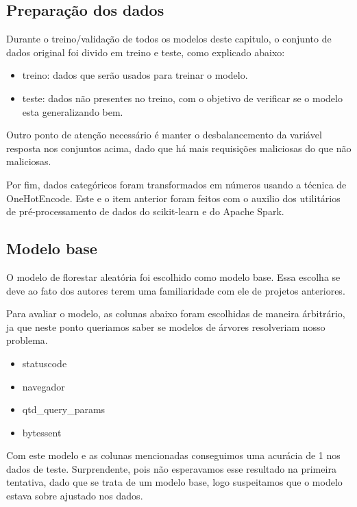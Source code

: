 \subsection{Preparação dos dados}

Durante o treino/validação de todos os modelos deste capitulo, o conjunto de dados original foi divido 
em treino e teste, como explicado abaixo:

\begin{itemize}
    \item treino: dados que serão usados para treinar o modelo.
    \item teste: dados não presentes no treino, com o objetivo de verificar se o modelo esta generalizando bem.
\end{itemize}

Outro ponto de atenção necessário é manter o desbalancemento da variável resposta nos 
conjuntos acima, dado que há mais requisições maliciosas do que não maliciosas. 

Por fim, dados categóricos foram transformados em números usando a técnica de OneHotEncode. Este e o item
anterior foram feitos com o auxilio dos utilitários de pré-processamento de dados do scikit-learn e do Apache Spark.

\subsection{Modelo base}

O modelo de florestar aleatória foi escolhido como modelo base. Essa escolha se deve ao fato dos autores 
terem uma familiaridade com ele de projetos anteriores. 

Para avaliar o modelo, as colunas abaixo foram escolhidas de maneira árbitrário, ja que neste ponto 
queriamos saber se modelos de árvores resolveriam nosso problema.

\begin{itemize}
    \item statuscode
    \item navegador
    \item qtd\_query\_params
    \item bytessent
\end{itemize}


Com este modelo e as colunas mencionadas conseguimos uma acurácia de 1 nos dados de teste. Surprendente, pois 
não esperavamos esse resultado na primeira tentativa, dado que se trata de um modelo base, logo suspeitamos 
que o modelo estava sobre ajustado nos dados. 

